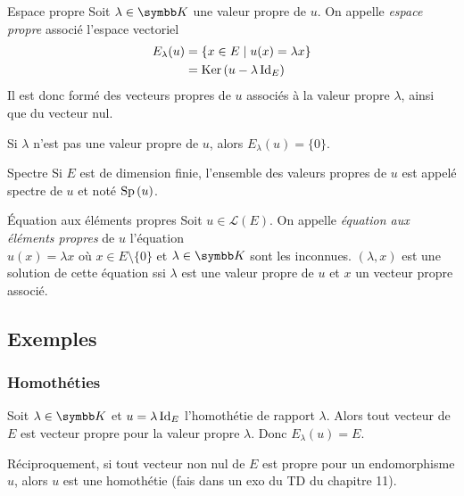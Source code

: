 \begin{definition}{Espace propre}{}
    Soit $\lambda \in \K$ une valeur propre de $u$. On appelle \emph{espace propre} 
    associé l'espace vectoriel 
    \begin{align} E_\lambda(u) & = \{ x \in E \mid u(x) = \lambda x \} \\
                        & = \operatorname{Ker} \, (u - \lambda \operatorname{Id}_E) 
    \end{align}
    Il est donc formé des vecteurs propres de $u$ associés à la valeur propre $\lambda$,
    ainsi que du vecteur nul.
\end{definition}

\begin{remarque}
    Si $\lambda$ n'est pas une valeur propre de $u$, alors $E_\lambda(u) = \{0\}$.
\end{remarque}

\begin{definition}{Spectre}{}
    Si $E$ est de dimension finie, l'ensemble des valeurs propres de $u$ est appelé spectre de $u$ 
    et noté $\operatorname{Sp} \,(u)$.
\end{definition}

\begin{definition}{Équation aux éléments propres}{}
    Soit $u \in \mathscr L(E)$. On appelle \emph{équation aux éléments propres} de $u$
    l'équation \\ 
    $u(x) = \lambda x$ où $x \in E \setminus \{0\}$ et $\lambda \in \K$ sont 
    les inconnues. $(\lambda, x)$ est une solution de cette équation ssi $\lambda$ est une valeur propre 
    de $u$ et $x$ un vecteur propre associé.
\end{definition}

\subsection{Exemples}
\subsubsection{Homothéties}

\begin{exemple}
    Soit $\lambda \in \K$ et $u = \lambda \operatorname{Id}_E$ l'homothétie de rapport $\lambda$. 
    Alors tout vecteur de $E$ est vecteur propre pour la valeur propre $\lambda$.
    Donc $E_\lambda(u) = E$.

    \avspace Réciproquement, si tout vecteur non nul de $E$ est propre pour un endomorphisme $u$, 
    alors $u$ est une homothétie (fais dans un exo du TD du chapitre 11).
\end{exemple}

